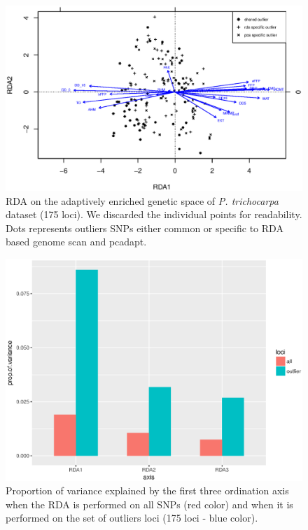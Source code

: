 \documentclass[a4paper,times,10pt,authoryear]{article}%
\begin{document}
\begin{figure}[t]
\begin{center}
\includegraphics[height=0.4\textheight]{figures/poplar_rda.eps}
\end{center}
\caption{RDA on the adaptively enriched genetic space of \textit{P. trichocarpa} dataset (175 loci). We discarded the individual points for readability. Dots represents outliers SNPs either common or specific to RDA based genome scan and pcadapt.}%
\label{fig:poplar_rda}%
\end{figure}

\begin{figure}[t]
\begin{center}
\includegraphics[height=0.4\textheight]{figures/varexplainedPopulus.eps}
\end{center}
\caption{Proportion of variance explained by the first three ordination axis when the RDA is performed on all SNPs (red color) and when it is performed on the set of outliers loci (175 loci - blue color).}%
\label{fig:varexplainedPopulus}%
\end{figure}
\end{document}
